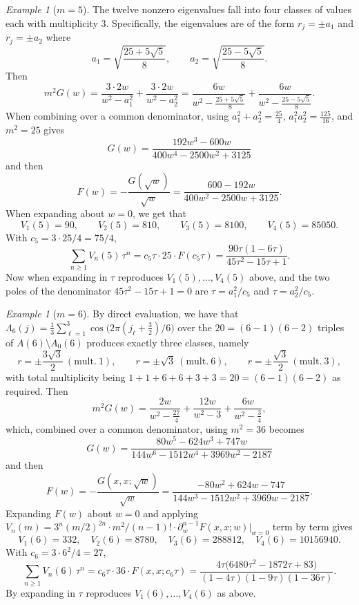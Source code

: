 \documentclass[11pt,reqno]{amsart}
\theoremstyle{remark}
\newtheorem{example}[theorem]{Example}
\begin{document}
\begin{example}[$m=5$]
\label{ex:m5}
The twelve nonzero eigenvalues fall into four classes of values each with multiplicity $3$.  Specifically,
the eigenvalues are of the form $r_j = \pm a_1$ and $r_j=\pm a_2$ where
\[
a_1 = \sqrt{\frac{25+5\sqrt5}{8}}, \qquad a_2 = \sqrt{\frac{25-5\sqrt5}{8}}.
\]
Then
\[
m^2 G(w) = \frac{3\cdot 2w}{w^2-a_1^2} + \frac{3\cdot 2w}{w^2-a_2^2}
= \frac{6w}{w^2-\tfrac{25+5\sqrt5}{8}} + \frac{6w}{w^2-\tfrac{25-5\sqrt5}{8}}.
\]
When combining over a common denominator, using $a_1^2+a_2^2 = \tfrac{25}{4}$,
$a_1^2 a_2^2 = \tfrac{125}{16}$, and $m^2=25$ gives
\[
G(w) = \frac{192w^3-600w}{400w^4-2500w^2+3125}
\]
and then
\[
F(w) = -\frac{G(\sqrt w)}{\sqrt w}
= \frac{600-192w}{400w^2-2500w+3125}.
\]
When expanding about $w=0$, we get that
\[
V_1(5) = 90,\qquad V_2(5) = 810, \qquad V_3(5)=8100,\qquad V_4(5) = 85050.
\]
With $c_5 = 3\cdot 25/4 = 75/4$,
\[
\sum_{n\ge1} V_n(5)\,\tau^n = c_5\tau\cdot 25\cdot F(c_5\tau)
= \frac{90\tau(1-6\tau)}{45\tau^2-15\tau+1}.
\]
Now when expanding in $\tau$ reproduces $V_1(5),\dots,V_4(5)$ above, and the two poles of the denominator
$45\tau^2-15\tau+1=0$ are $\tau = a_1^2/c_5$ and $\tau=a_2^2/c_5$.
\end{example}

\begin{example}[$m = 6$]
\label{ex:m6}
By direct evaluation, we have that $\Lambda_{6}(j) = \frac13\sum_{\ell=1}^3\cos\bigl(2\pi(j_\ell+\tfrac32)/6\bigr)$
over the $20 = (6-1)(6-2)$ triples of $A(6)\setminus A_0(6)$ produces exactly three
classes, namely
\[
r = \pm\frac{3\sqrt3}{2}\ (\text{mult.}\ 1), \qquad r=\pm\sqrt3\ (\text{mult.}\ 6), \qquad
r = \pm\frac{\sqrt3}{2}\ (\text{mult.}\ 3),
\]
with total multiplicity being $1+1+6+6+3+3=20 = (6-1)(6-2)$ as required.  Then
\[
m^2 G(w) = \frac{2w}{w^2-\tfrac{27}{4}} + \frac{12w}{w^2-3} + \frac{6w}{w^2-\tfrac34},
\]
which, combined over a common denominator, using $m^2=36$ becomes
\[
G(w) = \frac{80w^5-624w^3+747w}{144w^6-1512w^4+3969w^2-2187}
\]
and then
\[
F(w) = -\frac{G(x,x;\sqrt w)}{\sqrt w}
= \frac{-80w^2+624w-747}{144w^3-1512w^2+3969w-2187}.
\]
Expanding $F(w)$ about $w=0$ and applying
$V_n(m) = 3^n(m/2)^{2n}\cdot m^2/(n-1)!\cdot \partial_w^{n-1}F(x,x;w)\big|_{w=0}$ term by term gives
\[
V_1(6)=332,\quad V_2(6)=8780,\quad V_3(6)=288812,\quad V_4(6)=10156940.
\]
With $c_6 = 3\cdot 6^2/4 = 27$,
\[
\sum_{n\ge1} V_n(6)\,\tau^n = c_6\tau\cdot 36\cdot F(x,x;c_6\tau)
= \frac{4\tau\bigl(6480\tau^2-1872\tau+83\bigr)}{(1-4\tau)(1-9\tau)(1-36\tau)}.
\]
By expanding in $\tau$
reproduces $V_1(6),\dots,V_4(6)$ as above.
\end{example}
\end{document}
